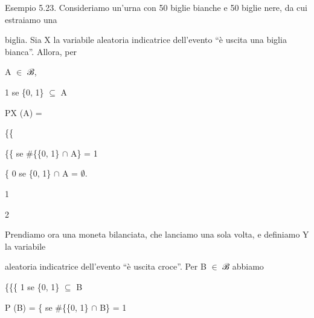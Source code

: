 \documentclass[a4paper,portrait,12pt]{article}
\begin{document}
\begin{flushleft}
Esempio 5.23. Consideriamo un'urna con 50 biglie bianche e 50 biglie nere, da cui estraiamo una
\end{flushleft}


\begin{flushleft}
biglia. Sia X la variabile aleatoria indicatrice dell'evento {``}\`{e} uscita una biglia bianca''. Allora, per
\end{flushleft}


\begin{flushleft}
A $\in$ ℬ,
\end{flushleft}


\begin{flushleft}
1 se \{0, 1\} $\subseteq$ A
\end{flushleft}


\begin{flushleft}
PX (A) =
\end{flushleft}





\{\{


\begin{flushleft}
\{\{ se \#\{\{0, 1\} $\cap$ A\} = 1
\end{flushleft}


\begin{flushleft}
\{ 0 se \{0, 1\} $\cap$ A = $\emptyset$.
\end{flushleft}


1


2





\begin{flushleft}
Prendiamo ora una moneta bilanciata, che lanciamo una sola volta, e definiamo Y la variabile
\end{flushleft}


\begin{flushleft}
aleatoria indicatrice dell'evento {``}\`{e} uscita croce''. Per B $\in$ ℬ abbiamo
\end{flushleft}





\begin{flushleft}
\{\{\{ 1 se \{0, 1\} $\subseteq$ B
\end{flushleft}


\begin{flushleft}
P (B) = \{ se \#\{\{0, 1\} $\cap$ B\} = 1
\end{flushleft}
\end{document}
